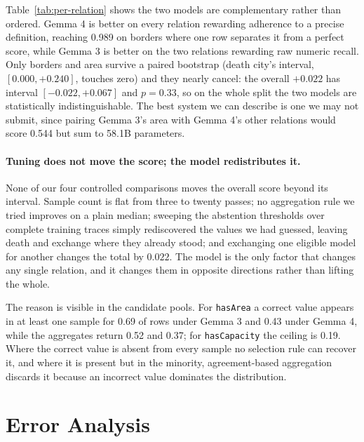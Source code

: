 \documentclass[11pt]{article}
\begin{document}
Table~\ref{tab:per-relation} shows the two models are complementary rather than
ordered. Gemma 4 is better on every relation rewarding adherence to a precise
definition, reaching 0.989 on borders where one row separates it from a perfect
score, while Gemma 3 is better on the two relations rewarding raw numeric
recall. Only borders and area survive a paired bootstrap (death city's
interval, $[0.000, +0.240]$, touches zero) and they nearly cancel: the overall
$+0.022$ has interval $[-0.022, +0.067]$ and $p=0.33$, so on the whole split
the two models are statistically indistinguishable. The best system we can
describe is one we may not submit, since pairing Gemma 3's area with Gemma 4's
other relations would score 0.544 but sum to 58.1B parameters.

\paragraph{Tuning does not move the score; the model redistributes it.}
None of our four controlled comparisons moves the overall score beyond its
interval. Sample count is flat from three to twenty passes; no aggregation
rule we tried improves on a plain median; sweeping the abstention thresholds
over complete training traces simply rediscovered the values we had guessed,
leaving death and exchange where they already stood; and exchanging one
eligible model for another changes the total by $0.022$. The model is the only
factor that changes any single relation, and it changes them in opposite
directions rather than lifting the whole.

The reason is visible in the candidate pools. For \texttt{hasArea} a correct
value appears in at least one sample for 0.69 of rows under Gemma 3 and 0.43
under Gemma 4, while the aggregates return 0.52 and 0.37; for
\texttt{hasCapacity} the ceiling is 0.19. Where the correct value is absent
from every sample no selection rule can recover it, and where it is present but
in the minority, agreement-based aggregation discards it because an incorrect
value dominates the distribution.

\section{Error Analysis}
\label{sec:error-analysis}
\end{document}
